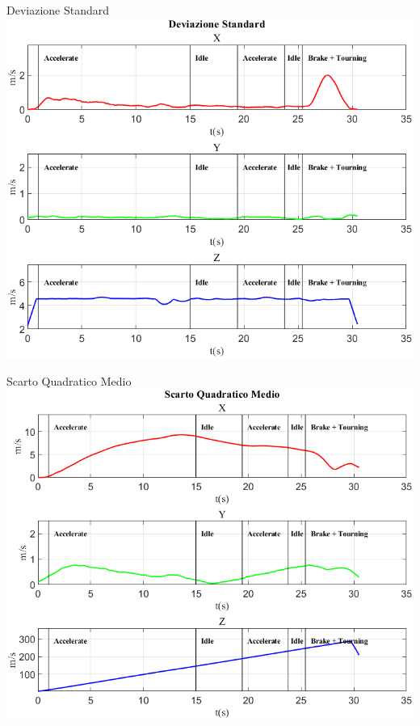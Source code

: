\documentclass[beamer]{standalone}
\begin{document}
	\begin{frame}{{Deviazione Standard}}
		\centering\includegraphics[height=.8\textheight]{figure/Vel/Deviazione Standard}
	\end{frame}
	
	\begin{frame}{{Scarto Quadratico Medio}}
		\centering\includegraphics[height=.8\textheight]{figure/Vel/Scarto Quadratico Medio}
	\end{frame}
	
\end{document}
